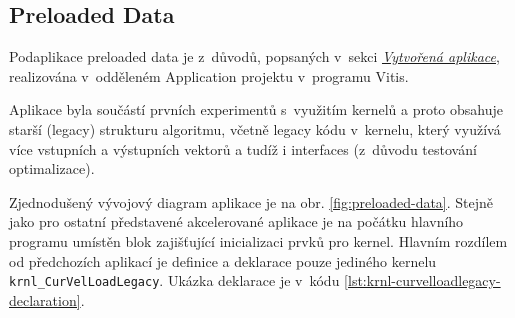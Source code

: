 \documentclass[a4paper, twoside, 11pt]{article}
\newcommand{\fbar}{\FloatBarrier}
\begin{document}
		



	   \fbar
	   \subsection{Preloaded Data}\label{subsec:preloaded-data}
	   Podaplikace preloaded data je z~důvodů, popsaných v~sekci \hyperref[sec:vytvorena-aplikace]{\textit{Vytvořená aplikace}}, realizována v~odděleném Application projektu v~programu Vitis.\par
	   Aplikace byla součástí prvních experimentů s~využitím kernelů a proto obsahuje starší (legacy) strukturu algoritmu, včetně legacy kódu v~kernelu, který využívá více vstupních a výstupních vektorů a tudíž i interfaces (z~důvodu testování optimalizace).\par
	   Zjednodušený vývojový diagram aplikace je na obr. \ref{fig:preloaded-data}. Stejně jako pro ostatní představené akcelerované aplikace je na počátku hlavního programu umístěn blok zajišťující inicializaci prvků pro kernel. Hlavním rozdílem od předchozích aplikací je definice a deklarace pouze jediného kernelu\\ \texttt{krnl\_CurVelLoadLegacy}. Ukázka deklarace je v~kódu \ref{lst:krnl-curvelloadlegacy-declaration}.\par
	   \newpage
\end{document}
